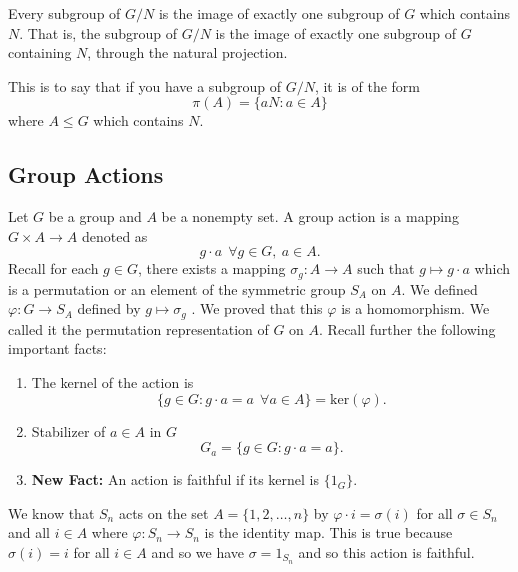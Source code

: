 \begin{remark}
  Every subgroup of \( G / N  \) is the image of exactly one subgroup of \( G  \) which contains \( N  \). That is, the subgroup of \( G /N  \) is the image of exactly one subgroup of \( G  \) containing \( N  \), through the natural projection. 

  This is to say that if you have a subgroup of \( G / N \), it is of the form  
  \[  \pi(A) = \{  a N : a \in A \} \]
  where \( A \leq G  \) which contains \( N  \). 
\end{remark}

\subsection{Group Actions}

Let \( G  \) be a group and \( A  \) be a nonempty set. A group action is a mapping \( G \times A \to A  \) denoted as 
\[  g \cdot a  \ \  \forall g \in G , \ a \in A. \]
Recall for each \( g \in G  \), there exists a mapping \( \sigma_g : A \to A  \) such that \( g \mapsto g \cdot a  \) which is a permutation or an element of the symmetric group \( {S}_{A} \) on \( A  \). We defined 
\(  \varphi : G \to {S}_{A} \)
defined by \( g \mapsto  \sigma_g \) . We proved that this \( \varphi  \) is a homomorphism. We called it the permutation representation of \( G  \) on \( A  \). Recall further the following important facts:

\begin{enumerate}
    \item[(1)] The kernel of the action is
        \[  \{ g \in G : g \cdot a = a  \ \ \forall a \in A  \} = \text{ker}(\varphi). \]
    \item[(2)] Stabilizer of \( a \in A  \) in \( G  \)
        \[  {G}_{a} = \{  g \in G : g \cdot a = a   \}.  \]
\item[(3)] \textbf{New Fact:} An action is faithful if its kernel is \( \{ {1}_{G} \}  \).
\end{enumerate}

\begin{eg}
   We know that \( {S}_{n} \) acts on the set \( A = \{  1,2, \dots, n  \}  \) by \( \varphi \cdot i  = \sigma(i) \) for all \( \sigma \in {S}_{n} \) and all \( i \in A  \) where \( \varphi : {S}_{n} \to {S}_{n} \) is the identity map. This is true because \( \sigma(i) = i \) for all \( i \in A  \) and so we have \( \sigma = {1}_{{S}_{n}} \) and so this action is faithful. 
\end{eg}

